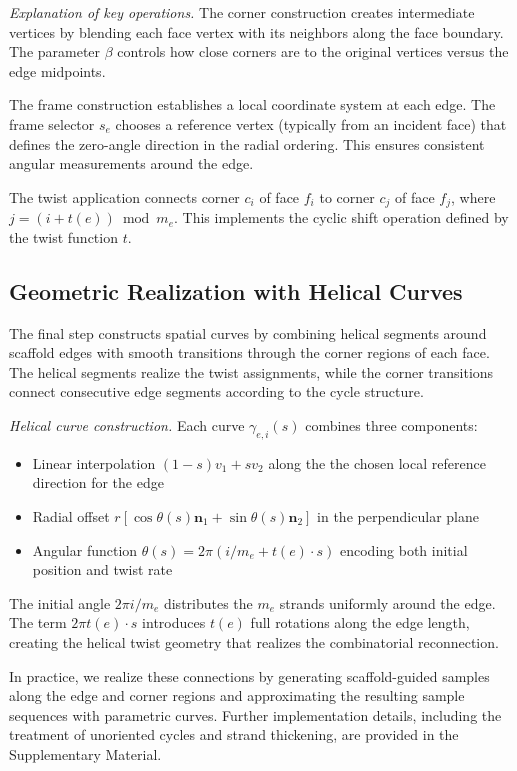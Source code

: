 \documentclass[acmtog]{acmart}
\begin{document}
\textit{Explanation of key operations.}
The corner construction creates intermediate vertices by blending each face vertex with its neighbors along the face boundary. The parameter $\beta$ controls how close corners are to the original vertices versus the edge midpoints.

The frame construction establishes a local coordinate system at each edge. The frame selector $s_e$ chooses a reference vertex (typically from an incident face) that defines the zero-angle direction in the radial ordering. This ensures consistent angular measurements around the edge.

The twist application connects corner $c_i$ of face $f_i$ to corner $c_j$ of face $f_j$, where $j = (i + t(e)) \bmod m_e$. This implements the cyclic shift operation defined by the twist function $t$.

\subsection{Geometric Realization with Helical Curves}


The final step constructs spatial curves by combining helical segments around scaffold edges with smooth transitions through the corner regions
of each face. The helical segments realize the twist assignments, while the corner transitions connect consecutive edge segments according to the
cycle structure.

\textit{Helical curve construction.}
Each curve $\gamma_{e,i}(s)$ combines three components:
\begin{itemize}
    \item Linear interpolation $(1-s)v_1 + sv_2$ along the the chosen local reference direction for the edge
    \item Radial offset $r[\cos\theta(s)\mathbf{n}_1 + \sin\theta(s)\mathbf{n}_2]$ in the perpendicular plane
    \item Angular function $\theta(s) = 2\pi(i/m_e + t(e) \cdot s)$ encoding both initial position and twist rate
\end{itemize}

The initial angle $2\pi i/m_e$ distributes the $m_e$ strands uniformly around the edge. The term $2\pi t(e) \cdot s$ introduces $t(e)$ full rotations along the edge length, creating the helical twist geometry that realizes the combinatorial reconnection.

In practice, we realize these connections by generating scaffold-guided
samples along the edge and corner regions and approximating the resulting
sample sequences with parametric curves. Further implementation details,
including the treatment of unoriented cycles and strand thickening, are
provided in the Supplementary Material.
\end{document}
